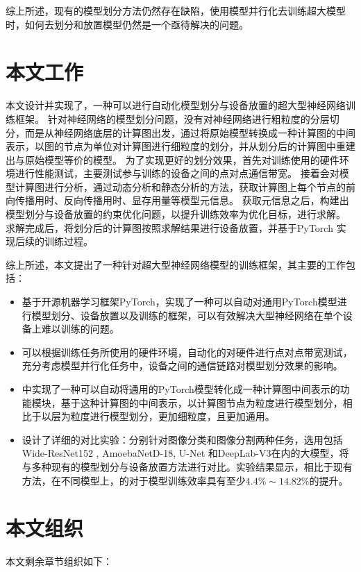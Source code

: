 综上所述，现有的模型划分方法仍然存在缺陷，使用模型并行化去训练超大模型时，如何去划分和放置模型仍然是一个亟待解决的问题。

\section{本文工作}
本文设计并实现了\sys，一种可以进行自动化模型划分与设备放置的超大型神经网络训练框架。
针对神经网络的模型划分问题，\sys 没有对神经网络进行粗粒度的分层切分，而是从神经网络底层的计算图出发，通过将原始模型转换成一种计算图的中间表示，以图的节点为单位对计算图进行细粒度的划分，并从划分后的计算图中重建出与原始模型等价的模型。
为了实现更好的划分效果，\sys 首先对训练使用的硬件环境进行性能测试，主要测试参与训练的设备之间的点对点通信带宽。
接着\sys 会对模型计算图进行分析，通过动态分析和静态分析的方法，获取计算图上每个节点的前向传播用时、反向传播用时、显存用量等模型元信息。
获取元信息之后，\sys 构建出模型划分与设备放置的约束优化问题，以提升训练效率为优化目标，进行求解。
求解完成后，\sys 将划分后的计算图按照求解结果进行设备放置，并基于PyTorch 实现后续的训练过程。

综上所述，本文提出了一种针对超大型神经网络模型的训练框架\sys，其主要的工作包括：
\begin{itemize}
	\item 基于开源机器学习框架PyTorch，实现了一种可以自动对通用PyTorch模型进行模型划分、设备放置以及训练的框架，可以有效解决大型神经网络在单个设备上难以训练的问题。
	\item \sys 可以根据训练任务所使用的硬件环境，自动化的对硬件进行点对点带宽测试，充分考虑模型并行化任务中，设备之间的通信链路对模型划分效果的影响。
	\item \sys 中实现了一种可以自动将通用的PyTorch模型转化成一种计算图中间表示的功能模块，基于这种计算图的中间表示，\sys 以计算图节点为粒度进行模型划分，相比于以层为粒度进行模型划分，更加细粒度，且更加通用。
	\item 设计了详细的对比实验：分别针对图像分类和图像分割两种任务，选用包括Wide-ResNet152 , AmoebaNetD-18, U-Net 和DeepLab-V3在内的大模型，将\sys 与多种现有的模型划分与设备放置方法进行对比。实验结果显示，相比于现有方法，在不同模型上，\sys 的对于模型训练效率具有至少$4.4\% \sim 14.82\%$的提升。
\end{itemize}

\section{本文组织}
本文剩余章节组织如下：

